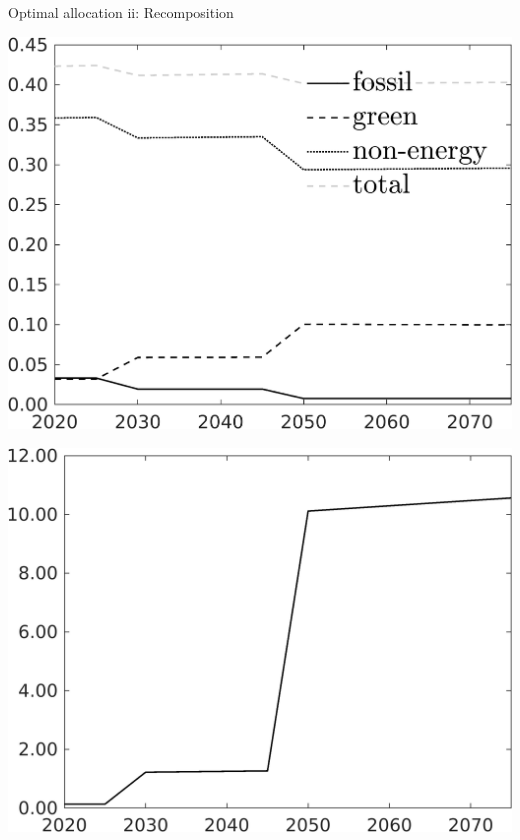 \documentclass[11pt,aspectratio=169]{beamer}
\begin{document}
\begin{frame}{Optimal allocation ii: Recomposition}
	\centering

\begin{minipage}[]{0.32\textwidth}
	\includegraphics[width=1\textwidth]{../codding_model/own_basedOnFried/optimalPol_elastS_DisuSci/figures/all_1705/SingleJointTOT_OPT_T_NoTaus_Science_spillover0_sep1_BN0_ineq0_red0_etaa0.79_lgd1.png}
\end{minipage}
	\begin{minipage}[]{0.32\textwidth}
		\includegraphics[width=1\textwidth]{../codding_model/own_basedOnFried/optimalPol_elastS_DisuSci/figures/all_1705/Single_OPT_T_NoTaus_GFF_spillover0_sep1_BN1_ineq0_red0_etaa0.79.png}

\end{minipage}
\end{frame}
\end{document}
